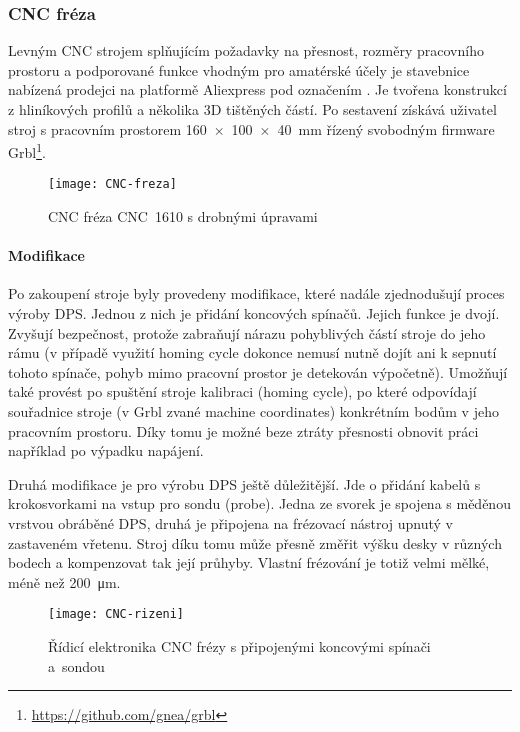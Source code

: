 \subsubsection{CNC fréza}
Levným CNC strojem splňujícím požadavky na přesnost, rozměry pracovního
prostoru a podporované funkce vhodným pro amatérské účely je stavebnice
nabízená prodejci na platformě Aliexpress pod označením .
Je tvořena konstrukcí z hliníkových profilů a několika 3D tištěných částí. Po
sestavení získává uživatel stroj
s pracovním prostorem \SI{160 x 100 x 40}{\milli\meter} řízený svobodným
firmware Grbl\footnote{\url{https://github.com/gnea/grbl}}.

\begin{figure}[htbp]
    \centering
    \texttt{[image: CNC-freza]}
    \caption{CNC fréza CNC~1610 s drobnými úpravami}
    \label{fig:CNC freza}
\end{figure}


\paragraph{Modifikace}
Po zakoupení stroje byly provedeny modifikace, které nadále zjednodušují proces
výroby DPS. Jednou z nich je přidání koncových spínačů. Jejich funkce je dvojí.
Zvyšují bezpečnost, protože zabraňují nárazu pohyblivých částí stroje do jeho
rámu (v případě využití \foreignlanguage{english}{homing cycle} dokonce nemusí
nutně dojít ani k sepnutí tohoto spínače, pohyb mimo pracovní prostor je
detekován výpočetně). Umožňují také provést po spuštění stroje kalibraci
(\foreignlanguage{english}{homing cycle}), po které odpovídají souřadnice
stroje (v Grbl zvané \foreignlanguage{english}{machine coordinates})
konkrétním bodům v jeho pracovním prostoru. Díky tomu je možné beze ztráty
přesnosti obnovit práci například po výpadku napájení.

Druhá modifikace je pro výrobu DPS ještě důležitější. Jde o přidání kabelů
s krokosvorkami na vstup pro sondu (\foreignlanguage{english}{probe}). Jedna ze
svorek je spojena s měděnou vrstvou obráběné DPS, druhá je připojena na
frézovací nástroj upnutý v zastaveném vřetenu. Stroj díku tomu může přesně
změřit výšku desky v různých bodech a kompenzovat tak její průhyby. Vlastní
frézování je totiž velmi mělké, méně než \SI{200}{\micro\meter}.

\begin{figure}[htbp]
    \centering
    \texttt{[image: CNC-rizeni]}
    \caption{%
        Řídicí elektronika CNC frézy s připojenými koncovými spínači a~sondou
    }
    \label{fig:CNC rizeni}
\end{figure}

